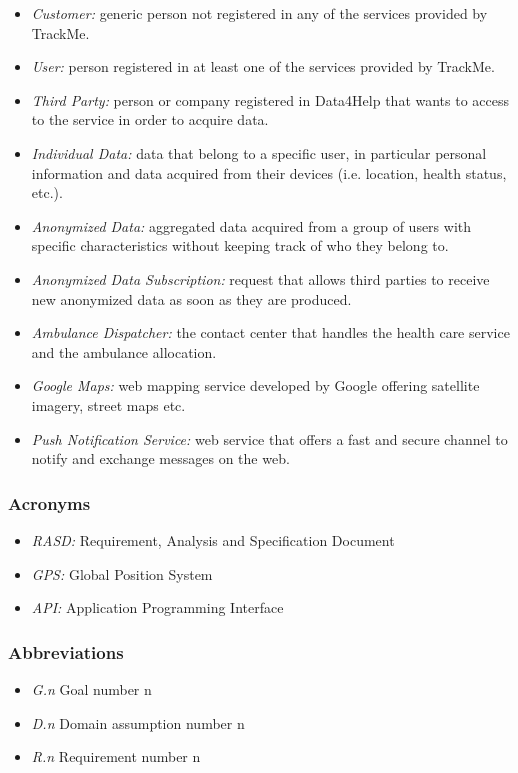 \documentclass[a4paper]{article}
\begin{document}
\begin{itemize}
    \item \textit{Customer:} generic person not registered in any of the services provided by TrackMe. 
    \item \textit{User:} person registered in at least one of the services provided by TrackMe.
    \item \textit{Third Party:} person or company registered in Data4Help that wants to access to the service in order to acquire data.
    \item \textit{Individual Data:} data that belong to a specific user, in particular personal information and data acquired from their devices (i.e. location, health status, etc.).
    \item \textit{Anonymized Data:} aggregated data acquired from a group of users with specific characteristics without keeping track of who they belong to.
    \item \textit{Anonymized Data Subscription:} request that allows third parties to receive new anonymized data as soon as they are produced.
    \item \textit{Ambulance Dispatcher:} the contact center that handles the health care service and the ambulance allocation.
    \item \textit{Google Maps:} web mapping service developed by Google offering satellite imagery, street maps etc.
    \item \textit{Push Notification Service:} web service that offers a fast and secure channel to notify and exchange messages on the web.
\end{itemize}

\subsubsection{Acronyms}

\begin{itemize}
    \item \textit{RASD:} Requirement, Analysis and Specification Document
    \item \textit{GPS:} Global Position System
    \item \textit{API:} Application Programming Interface
\end{itemize}

\subsubsection{Abbreviations}
    \begin{itemize}
    \item \textit{G.n} Goal number n
    \item \textit{D.n} Domain assumption number n
    \item \textit{R.n} Requirement number n
\end{itemize}
\end{document}
